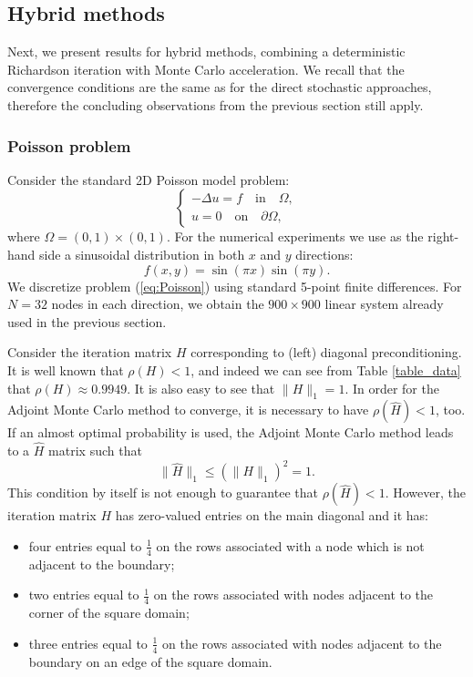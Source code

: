 \documentclass[final,leqno,onefignum,onetabnum]{siamltex1213}
\begin{document}
\subsection{Hybrid methods}
Next, we present results for hybrid methods, combining a deterministic
Richardson iteration with Monte Carlo acceleration. We recall that the
convergence conditions are the same as for the direct stochastic
approaches, therefore the concluding observations from the previous section
still apply.

\subsubsection{Poisson problem}

Consider the standard 2D Poisson model problem:
\begin{equation}
\begin{cases}
 -\Delta u = f \quad \text{in}\quad \Omega, \\
 u=0\quad \text{on} \quad \partial\Omega ,
 \end{cases}
\label{eq:Poisson}
\end{equation}
where $\Omega=(0,1)\times (0,1)$. %
For the numerical experiments we use as the right-hand side
a sinusoidal distribution in both $x$ and $y$ directions:
\[
 f(x, y)=\sin ({\pi x})\sin ({\pi y}).
\]
We discretize problem (\ref{eq:Poisson}) using standard 5-point finite
differences. For $N=32$ nodes in each direction, we obtain the $900\times 900$
linear system already used in the previous section.

Consider the iteration matrix $H$ corresponding to (left) diagonal
preconditioning. It is well known that $\rho(H) <1$, and indeed we
can see from Table \ref{table_data} that $\rho(H)\approx 0.9949$.
It is also easy to see that $\|H\|_1 = 1$.
In order for the Adjoint Monte Carlo
method to converge, it is necessary to
have $\rho(\hat{H}) < 1$, too. If an
almost optimal probability is used,
the Adjoint Monte Carlo method leads to a $\hat{H}$ matrix such that
\[
 \lVert \hat{H}\rVert_1\le (\rVert H\rVert_1)^2=1.
\]
This condition by itself is not enough to guarantee that
$\rho(\hat{H})<1$.
However, the iteration matrix $H$ has zero-valued
entries on the main diagonal and it has:
\begin{itemize}
 \item four entries equal to $\frac{1}{4}$ on the rows associated
with a node which is not adjacent to the boundary;
\item two entries equal to $\frac{1}{4}$ on the rows associated with nodes
adjacent to the corner of the square domain;
\item three entries equal to $\frac{1}{4}$ on the rows associated with nodes
adjacent to the boundary on an edge of the square domain.
\end{itemize}
\end{document}
